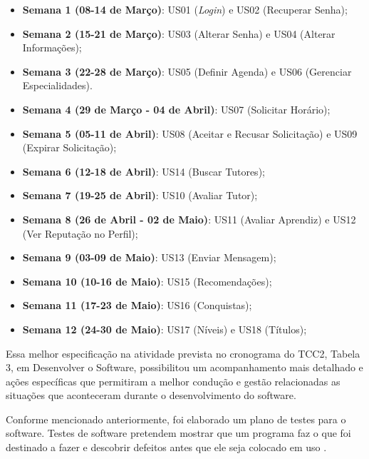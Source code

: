 \begin{itemize}

\item \textbf{Semana 1 (08-14 de Março)}: US01 (\textit{Login}) e US02 (Recuperar Senha);

\item \textbf{Semana 2 (15-21 de Março)}: US03 (Alterar Senha) e US04 (Alterar Informações);

\item \textbf{Semana 3 (22-28 de Março)}: US05 (Definir Agenda) e US06 (Gerenciar Especialidades).

\item \textbf{Semana 4 (29 de Março - 04 de Abril)}: US07 (Solicitar Horário);

\item \textbf{Semana 5 (05-11 de Abril)}: US08 (Aceitar e Recusar Solicitação) e US09 (Expirar Solicitação);

\item \textbf{Semana 6 (12-18 de Abril)}: US14 (Buscar Tutores);

\item \textbf{Semana 7 (19-25 de Abril)}: US10 (Avaliar Tutor);

\item \textbf{Semana 8 (26 de Abril - 02 de Maio)}: US11 (Avaliar Aprendiz) e US12 (Ver Reputação no Perfil);

\item \textbf{Semana 9 (03-09 de Maio)}: US13 (Enviar Mensagem);

\item \textbf{Semana 10 (10-16 de Maio)}: US15 (Recomendações);

\item \textbf{Semana 11 (17-23 de Maio)}: US16 (Conquistas);

\item \textbf{Semana 12 (24-30 de Maio)}: US17 (Níveis) e US18 (Títulos);

\end{itemize}

Essa melhor especificação na atividade prevista no cronograma do TCC2, Tabela 3, em Desenvolver o Software, possibilitou um acompanhamento mais detalhado e ações específicas que permitiram a melhor condução e gestão relacionadas as situações que aconteceram durante o desenvolvimento do software.

Conforme mencionado anteriormente, foi elaborado um plano de testes para o software. Testes de software pretendem mostrar que um programa faz o que foi destinado a fazer e descobrir defeitos antes que ele seja colocado em uso \cite{sommerville2011engenharia}.

